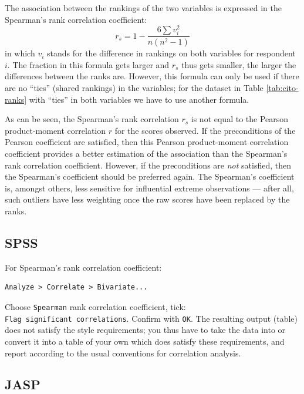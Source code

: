 \documentclass[
]{book}
\begin{document}
The association between the rankings of the two variables is expressed
in the Spearman's rank correlation coefficient:
\begin{equation}
    r_s = 1 - \frac{6 \sum v_i^2}{n(n^2-1)}
  \label{eq:spearman}
\end{equation}
in which \(v_i\) stands for
the difference in rankings on both variables for respondent \(i\). The fraction
in this formula gets larger and \(r_s\) thus gets smaller, the larger the
differences between the ranks are.
However, this formula can only be used if there are no ``ties'' (shared rankings) in the
variables; for the dataset in Table \ref{tab:cito-ranks} with ``ties'' in both variables
we have to use another formula.

As can be seen, the Spearman's rank correlation \(r_s\) is not equal to the
Pearson product-moment correlation \(r\) for the scores observed.
If the preconditions of the Pearson coefficient are satisfied, then this
Pearson product-moment correlation coefficient provides a better estimation of the
association than the Spearman's rank correlation coefficient. However, if the preconditions
are \emph{not} satisfied, then the Spearman's coefficient should be preferred again. The
Spearman's coefficient is, amongst others, less sensitive for influential extreme
observations --- after all, such outliers have less weighting once the
raw scores have been replaced by the ranks.

\hypertarget{spss-7}{%
\subsection{SPSS}\label{spss-7}}

For Spearman's rank correlation coefficient:

\begin{verbatim}
Analyze > Correlate > Bivariate...
\end{verbatim}

Choose \texttt{Spearman} rank correlation coefficient, tick:
\texttt{Flag\ significant\ correlations}. Confirm with \texttt{OK}. The resulting
output (table) does not satisfy the style requirements; you thus have to take
the data into or convert it into a table of your own which does satisfy these requirements,
and report according to the usual conventions for correlation analysis.

\hypertarget{jasp-8}{%
\subsection{JASP}\label{jasp-8}}
\end{document}
